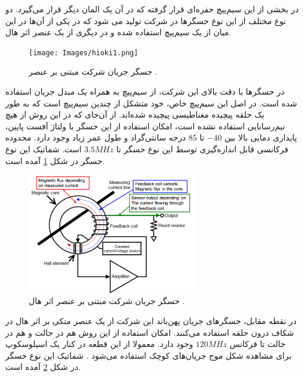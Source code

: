 در بخشی از این سیم‌پیچ حفره‌ای قرار گرفته که در آن یک المان دیگر قرار می‌گیرد. دو نوع مختلف  از این نوع حسگر‌ها در شرکت 
تولید می شود که در یکی از آن‌ها در این میان از یک سیم‌پیچ  استفاده شده و در دیگری از یک عنصر اثر هال.

\begin{figure}[t]
	
	\centering 
	\texttt{[image: Images/hioki1.png]}
	\caption{
		حسگر جریان شرکت  مبتنی بر عنصر 
		\cite{hioki}.
	}\label{fig:10}
\end{figure}


در حسگر‌ها با دقت بالای این شرکت، از سیم‌پیچ  به همراه یک مبدل جریان استفاده شده است. در اصل این سیم‌پیچ خاص، خود متشکل از چندین سیم‌پیچ است که به طور یک حلقه پیچیده مغناطیسی پیچیده شده‌اند. از ‌آن‌جای که در این روش از هیچ نیم‌رسانایی استفاده نشده است، امکان استفاده از این حسگر با ولتاژ آفست پایین، پایداری دمایی بالا بین $-40$ تا $85$ درجه سانتی‌گراد و طول عمر زیاد وجود دارد. محدوده فرکانسی قابل اندازه‌گیری توسط این نوع حسگر تا $3.5MHz$ است. شماتیک این نوع حسگر در شکل
\ref{fig:10}
آمده است.



\begin{figure}[t]
	
	\centering 
	\includegraphics[width=75mm]{Images/hioki2.png}
	\caption{
		حسگر جریان شرکت  مبتنی بر عنصر اثر هال
		\cite{hioki}.
	}\label{fig:11}
\end{figure}

در نقطه مقابل، حسگر‌های جریان پهن‌باند این شرکت از یک عنصر متکی بر اثر هال در شکاف درون حلقه استفاده می‌کنند. امکان استفاده از این روش هم در حالت  و هم در حالت  تا فرکانس $120MHz$ وجود دارد. معمولا از این قطعه در کنار یک اسیلوسکوپ برای مشاهده شکل موج جریان‌های کوچک استفاده می‌شود \cite{hioki}. شماتیک این نوع حسگر در شکل
\ref{fig:11}
آمده است.


